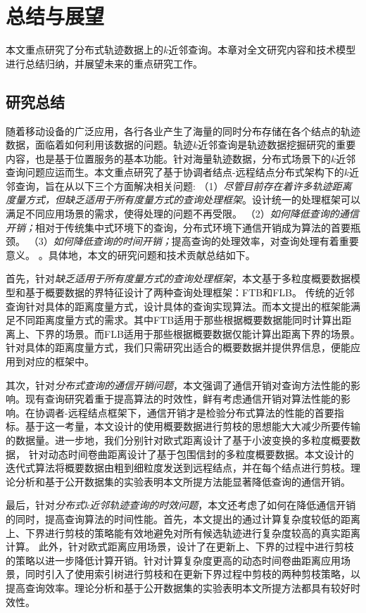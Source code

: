 \chapter{总结与展望}

本文重点研究了分布式轨迹数据上的$k$近邻查询。本章对全文研究内容和技术模型进行总结归纳，并展望未来的重点研究工作。

\section{研究总结}

随着移动设备的广泛应用，各行各业产生了海量的同时分布存储在各个结点的轨迹数据，面临着如何利用该数据的问题。轨迹$k$近邻查询是轨迹数据挖掘研究的重要内容，也是基于位置服务的基本功能。针对海量轨迹数据，分布式场景下的$k$近邻查询问题应运而生。本文重点研究了基于协调者结点-远程结点分布式架构下的$k$近邻查询，旨在从以下三个方面解决相关问题:
（1）\textit{尽管目前存在着许多轨迹距离度量方式，但缺乏适用于所有度量方式的查询处理框架}。设计统一的处理框架可以满足不同应用场景的需求，使得处理的问题不再受限。
（2）\textit{如何降低查询的通信开销；}相对于传统集中式环境下的查询，分布式环境下通信开销成为算法的首要瓶颈。
（3）\textit{如何降低查询的时间开销；}提高查询的处理效率，对查询处理有着重要意义。
。具体地，本文的研究问题和技术贡献总结如下。

首先，针对\textit{缺乏适用于所有度量方式的查询处理框架}，本文基于多粒度概要数据模型和基于概要数据的界特征设计了两种查询处理框架：FTB和FLB。 传统的近邻查询针对具体的距离度量方式，设计具体的查询实现算法。而本文提出的框架能满足不同距离度量方式的需求。其中FTB适用于那些根据概要数据能同时计算出距离上、下界的场景。而FLB适用于那些根据概要数据仅能计算出距离下界的场景。
针对具体的距离度量方式，我们只需研究出适合的概要数据并提供界信息，便能应用到对应的框架中。

其次，针对\textit{分布式查询的通信开销问题}，本文强调了通信开销对查询方法性能的影响。现有查询研究着重于提高算法的时效性，鲜有考虑通信开销对算法性能的影响。在协调者-远程结点框架下，通信开销才是检验分布式算法的性能的首要指标。基于这一考量，本文设计的使用概要数据进行剪枝的思想能大大减少所要传输的数据量。进一步地，我们分别针对欧式距离设计了基于小波变换的多粒度概要数据，
针对动态时间卷曲距离设计了基于包围信封的多粒度概要数据。本文设计的迭代式算法将概要数据由粗到细粒度发送到远程结点，并在每个结点进行剪枝。理论分析和基于公开数据集的实验表明本文所提方法能显著降低查询的通信开销。
	
最后，针对\textit{分布式$k$近邻轨迹查询的时效问题}，本文还考虑了如何在降低通信开销的同时，提高查询算法的时间性能。首先，本文提出的通过计算复杂度较低的距离上、下界进行剪枝的策略能有效地避免对所有候选轨迹进行复杂度较高的真实距离计算。
此外，针对欧式距离应用场景，设计了在更新上、下界的过程中进行剪枝的策略以进一步降低计算开销。针对计算复杂度更高的动态时间卷曲距离应用场景，同时引入了使用索引树进行剪枝和在更新下界过程中剪枝的两种剪枝策略，以提高查询效率。理论分析和基于公开数据集的实验表明本文所提方法都具有较好时效性。

